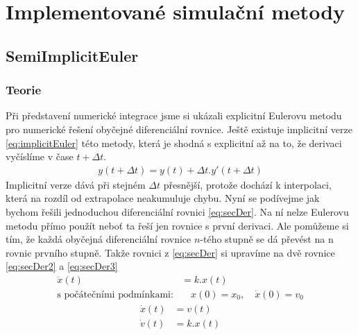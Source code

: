 \chapter{Implementované simulační metody}
\section{SemiImplicitEuler}
\label{sec:implEuler}
\subsection{Teorie}
Při představení numerické integrace jsme si ukázali explicitní Eulerovu metodu pro numerické řešení obyčejné diferenciální rovnice. Ještě existuje implicitní verze \ref{eq:implicitEuler} této metody, která je shodná s explicitní až na to, že derivaci vyčíslíme v čase $t + \Delta t $.
\begin{align} \label{eq:implicitEuler}
y(t+\Delta t) = y(t) + \Delta t . y'(t+\Delta t)
\end{align}
Implicitní verze dává při stejném $ \Delta t $ přesnější, protože dochází k interpolaci, která na rozdíl od extrapolace neakumuluje chybu.
Nyní se podívejme jak bychom řešili jednoduchou diferenciální rovnici \ref{eq:secDer}. Na ní nelze Eulerovu metodu přímo použít neboť ta řeší jen rovnice s první derivaci. Ale pomůžeme si tím, že každá obyčejná diferenciální rovnice $ n $-tého stupně se dá převést na n rovnic prvního stupně. Takže rovnici z \eqref{eq:secDer} si upravíme na dvě rovnice \eqref{eq:secDer2} a \eqref{eq:secDer3}
\begin{align} \label{eq:secDer}
\ddot{x}(t) &= k.x(t) \quad \\
\text{s počátečními podmínkami:}& \quad x(0)=x_0, \quad \dot{x}(0)=v_0\nonumber
\end{align}
\begin{subequations}
	\label{eq:secDer23}
	\begin{align}
	\label{eq:secDer2}
	\dot x(t)&= v(t) \\
	\label{eq:secDer3}
	\dot v(t)&=k.x(t)
	\end{align}
\end{subequations}

